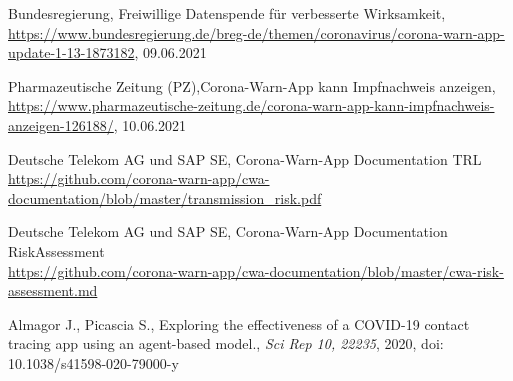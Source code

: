 \documentclass[conference,compsoc]{IEEEtran}
\begin{document}
\begin{thebibliography}{00}
 Bundesregierung, \glqq Freiwillige Datenspende für verbesserte Wirksamkeit\grqq, \\\url{https://www.bundesregierung.de/breg-de/themen/coronavirus/corona-warn-app-update-1-13-1873182}, 09.06.2021

 Pharmazeutische Zeitung (PZ),\glqq Corona-Warn-App kann Impfnachweis anzeigen\grqq,
\url{https://www.pharmazeutische-zeitung.de/corona-warn-app-kann-impfnachweis-anzeigen-126188/}, 10.06.2021

 Deutsche Telekom AG und SAP SE, \glqq Corona-Warn-App Documentation TRL\grqq \\\url{https://github.com/corona-warn-app/cwa-documentation/blob/master/transmission_risk.pdf}

 Deutsche Telekom AG und SAP SE, \glqq Corona-Warn-App Documentation RiskAssessment\grqq \\\url{https://github.com/corona-warn-app/cwa-documentation/blob/master/cwa-risk-assessment.md}

 Almagor J., Picascia S., \glqq Exploring the effectiveness of a COVID-19 contact tracing app using an agent-based model.\grqq, \textit{Sci Rep 10, 22235}, 2020, doi: 10.1038/s41598-020-79000-y

\end{thebibliography}
\vspace{12pt}
\end{document}
